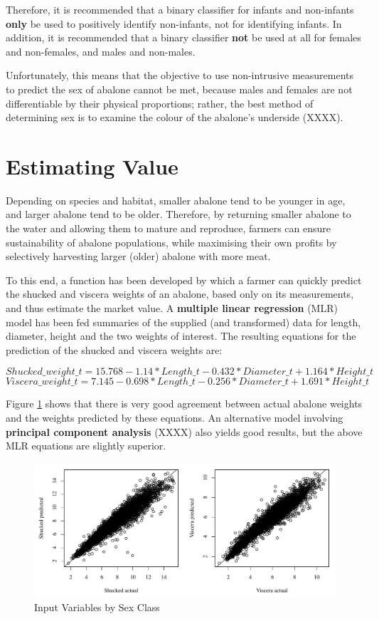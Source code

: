 \documentclass[11pt, a4paper]{article}
\begin{document}
    Therefore, it is recommended that a binary classifier for infants and non-infants \textbf{only} be used to positively identify non-infants, not for identifying infants. In addition, it is recommended that a binary classifier \textbf{not} be used at all for females and non-females, and males and non-males.

    Unfortunately, this means that the objective to use non-intrusive measurements to predict the sex of abalone cannot be met, because males and females are not differentiable by their physical proportions; rather, the best  method of determining sex is to examine the colour of the abalone's underside (XXXX). 

    \section{Estimating Value}

    Depending on species and habitat, smaller abalone tend to be younger in age, and larger abalone tend to be older. Therefore, by returning smaller abalone to the water and allowing them to mature and reproduce, farmers can ensure sustainability of abalone populations, while maximising their own profits by selectively harvesting larger (older) abalone with more meat.

    To this end, a function has been developed by which a farmer can quickly predict the shucked and viscera weights of an abalone, based only on its measurements, and thus estimate the market value. A \textbf{multiple linear regression} (MLR) model has been fed summaries of the supplied (and transformed) data for length, diameter, height and the two weights of interest. The resulting equations for the prediction of the shucked and viscera weights are:

    $$ Shucked\_weight\_t = 15.768 - 1.14*Length\_t - 0.432*Diameter\_t + 1.164*Height\_t $$
    $$ Viscera\_weight\_t = 7.145 - 0.698*Length\_t - 0.256*Diameter\_t + 1.691*Height\_t $$

    Figure \ref{mlr} shows that there is very good agreement between actual abalone weights and the weights predicted by these equations. An alternative model involving \textbf{principal component analysis} (XXXX) also yields good results, but the above MLR equations are slightly superior.

    \begin{figure}[ht]
        \centering
        \includegraphics[width=\textwidth]{3.2.pdf}
        \caption{Input Variables by Sex Class}
        \label{mlr}
    \end{figure}
\end{document}
